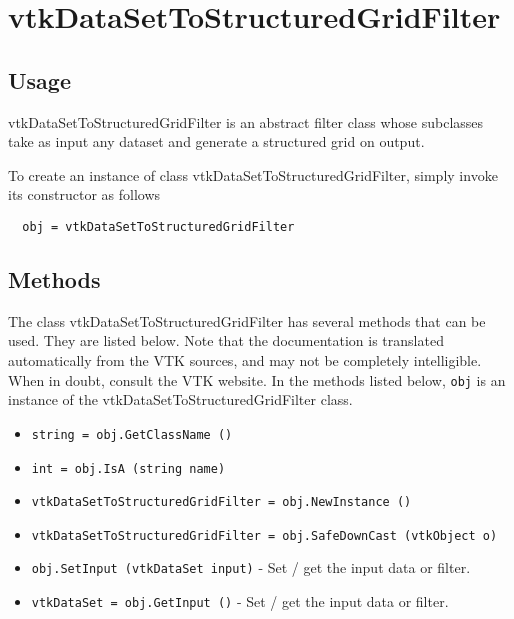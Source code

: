 \section{vtkDataSetToStructuredGridFilter}

\subsection{Usage}

 vtkDataSetToStructuredGridFilter is an abstract filter class whose 
 subclasses take as input any dataset and generate a structured
 grid on output.

To create an instance of class vtkDataSetToStructuredGridFilter, simply
invoke its constructor as follows
\begin{verbatim}
  obj = vtkDataSetToStructuredGridFilter
\end{verbatim}
\subsection{Methods}

The class vtkDataSetToStructuredGridFilter has several methods that can be used.
  They are listed below.
Note that the documentation is translated automatically from the VTK sources,
and may not be completely intelligible.  When in doubt, consult the VTK website.
In the methods listed below, \verb|obj| is an instance of the vtkDataSetToStructuredGridFilter class.
\begin{itemize}
\item  \verb|string = obj.GetClassName ()|

\item  \verb|int = obj.IsA (string name)|

\item  \verb|vtkDataSetToStructuredGridFilter = obj.NewInstance ()|

\item  \verb|vtkDataSetToStructuredGridFilter = obj.SafeDownCast (vtkObject o)|

\item  \verb|obj.SetInput (vtkDataSet input)| -  Set / get the input data or filter.

\item  \verb|vtkDataSet = obj.GetInput ()| -  Set / get the input data or filter.

\end{itemize}
